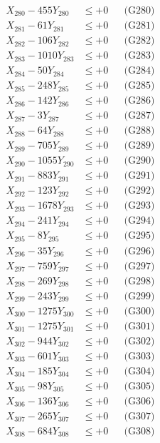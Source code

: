 \documentclass[a4paper,10pt]{article}
\begin{document}
{\begin{align}
X_{280} - 455Y_{280} &\leq +0 && \text{(G280)} \\
\allowbreak
X_{281} - 61Y_{281} &\leq +0 && \text{(G281)} \\
X_{282} - 106Y_{282} &\leq +0 && \text{(G282)} \\
X_{283} - 1010Y_{283} &\leq +0 && \text{(G283)} \\
X_{284} - 50Y_{284} &\leq +0 && \text{(G284)} \\
X_{285} - 248Y_{285} &\leq +0 && \text{(G285)} \\
X_{286} - 142Y_{286} &\leq +0 && \text{(G286)} \\
X_{287} - 3Y_{287} &\leq +0 && \text{(G287)} \\
X_{288} - 64Y_{288} &\leq +0 && \text{(G288)} \\
X_{289} - 705Y_{289} &\leq +0 && \text{(G289)} \\
X_{290} - 1055Y_{290} &\leq +0 && \text{(G290)} \\
\allowbreak
X_{291} - 883Y_{291} &\leq +0 && \text{(G291)} \\
X_{292} - 123Y_{292} &\leq +0 && \text{(G292)} \\
X_{293} - 1678Y_{293} &\leq +0 && \text{(G293)} \\
X_{294} - 241Y_{294} &\leq +0 && \text{(G294)} \\
X_{295} - 8Y_{295} &\leq +0 && \text{(G295)} \\
X_{296} - 35Y_{296} &\leq +0 && \text{(G296)} \\
X_{297} - 759Y_{297} &\leq +0 && \text{(G297)} \\
X_{298} - 269Y_{298} &\leq +0 && \text{(G298)} \\
X_{299} - 243Y_{299} &\leq +0 && \text{(G299)} \\
X_{300} - 1275Y_{300} &\leq +0 && \text{(G300)} \\
\allowbreak
X_{301} - 1275Y_{301} &\leq +0 && \text{(G301)} \\
X_{302} - 944Y_{302} &\leq +0 && \text{(G302)} \\
X_{303} - 601Y_{303} &\leq +0 && \text{(G303)} \\
X_{304} - 185Y_{304} &\leq +0 && \text{(G304)} \\
X_{305} - 98Y_{305} &\leq +0 && \text{(G305)} \\
X_{306} - 136Y_{306} &\leq +0 && \text{(G306)} \\
X_{307} - 265Y_{307} &\leq +0 && \text{(G307)} \\
X_{308} - 684Y_{308} &\leq +0 && \text{(G308)} \\

\end{align}}
\end{document}
